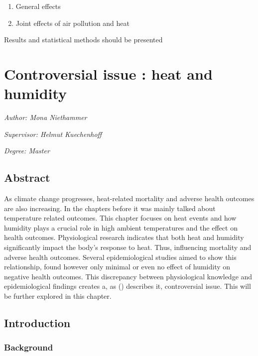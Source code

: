 \documentclass[
]{krantz}
\begin{document}
\begin{enumerate}
\item
  General effects
  \citet{masselot}
\item
  Joint effects of air pollution and heat
  \citet{stafoggia}
\end{enumerate}

Results and statistical methods should be presented

\chapter{Controversial issue : heat and humidity}\label{he3}

\emph{Author: Mona Niethammer}

\emph{Supervisor: Helmut Kuechenhoff}

\emph{Degree: Master}

\section{Abstract}\label{abstract-3}

As climate change progresses, heat-related mortality and adverse health outcomes are also increasing. In the chapters before it was mainly talked about temperature related outcomes. This chapter focuses on heat events and how humidity plays a crucial role in high ambient temperatures and the effect on health outcomes. Physiological research indicates that both heat and humidity significantly impact the body's response to heat. Thus, influencing mortality and adverse health outcomes. Several epidemiological studies aimed to show this relationship, found however only minimal or even no effect of humidity on negative health outcomes. This discrepancy between physiological knowledge and epidemiological findings creates a, as (\citet{bald}) describes it, controversial issue. This will be further explored in this chapter.

\section{Introduction}\label{introduction-5}

\subsection{Background}\label{background-1}
\end{document}
